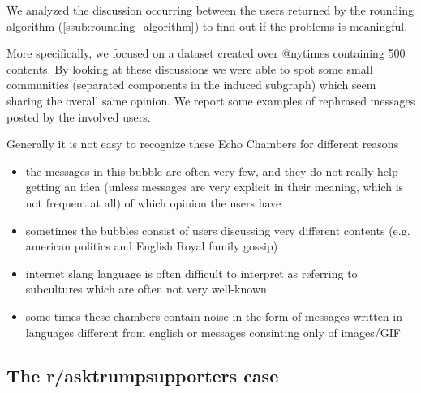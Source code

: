 We analyzed the discussion occurring between the users returned by the
rounding algorithm (\autoref{ssub:rounding_algorithm}) to find out if the
problems is meaningful.

More specifically, we focused on a dataset created over @nytimes containing 500
contents. By looking at these discussions we were able to spot some small
communities (separated components in the induced subgraph) which seem sharing
the overall same opinion. We report some examples of rephrased messages posted
by the involved users.


Generally it is not easy to recognize these Echo Chambers for different reasons

\begin{itemize}
	\item the messages in this bubble are often very few, and they do not
	      really help getting an idea (unless messages are very explicit in their
	      meaning, which is not frequent at all) of which opinion the users have
	\item sometimes the bubbles consist of users discussing very
	      different contents (e.g. american politics and English Royal
	      family gossip)
	\item internet slang language is often difficult to interpret as
	      referring to subcultures which are often not very well-known
	\item some times these chambers contain noise in the form of messages
	      written in languages different from english or messages consinting only
	      of images/GIF
\end{itemize}

\subsection{The r/asktrumpsupporters case}%
\label{sub:the_r_asktrumpsupporters_case}

